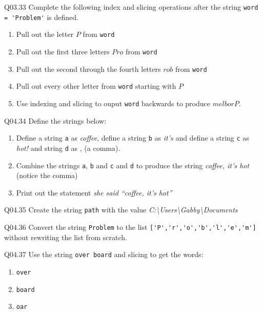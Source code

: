 \documentclass{book}
\newcommand{\passthrough}[1]{#1}
\begin{document}
Q03.33 Complete the following index and slicing operations after the
string \passthrough{\lstinline!word = 'Problem'!} is defined.

\begin{enumerate}
\def\labelenumi{(\alph{enumi})}
\item
  Pull out the letter \(P\) from \passthrough{\lstinline!word!}
\item
  Pull out the first three letters \(Pro\) from
  \passthrough{\lstinline!word!}
\item
  Pull out the second through the fourth letters \(rob\) from
  \passthrough{\lstinline!word!}
\item
  Pull out every other letter from \passthrough{\lstinline!word!}
  starting with \(P\)
\item
  Use indexing and slicing to ouput \passthrough{\lstinline!word!}
  backwards to produce \(melborP\).
\end{enumerate}

Q04.34 Define the strings below:

\begin{enumerate}
\def\labelenumi{(\alph{enumi})}
\item
  Define a string \passthrough{\lstinline!a!} as \emph{coffee}, define a
  string \passthrough{\lstinline!b!} as \emph{it's} and define a string
  \passthrough{\lstinline!c!} as \emph{hot!} and string
  \passthrough{\lstinline!d!} as , (a comma).
\item
  Combine the strings \passthrough{\lstinline!a!},
  \passthrough{\lstinline!b!} and \passthrough{\lstinline!c!} and
  \passthrough{\lstinline!d!} to produce the string \emph{coffee, it's
  hot} (notice the comma)
\item
  Print out the statement \emph{she said ``coffee, it's hot''}
\end{enumerate}

Q04.35 Create the string \passthrough{\lstinline!path!} with the value
\emph{C:\textbackslash{}Users\textbackslash{}Gabby\textbackslash{}Documents}

Q04.36 Convert the string \passthrough{\lstinline!Problem!} to the list
\passthrough{\lstinline!['P','r','o','b','l','e','m']!} without
rewriting the list from scratch.

Q04.37 Use the string \passthrough{\lstinline!over board!} and slicing
to get the words:

\begin{enumerate}
\def\labelenumi{(\alph{enumi})}
\item
  \passthrough{\lstinline!over!}
\item
  \passthrough{\lstinline!board!}
\item
  \passthrough{\lstinline!oar!}
\end{enumerate}
\end{document}
